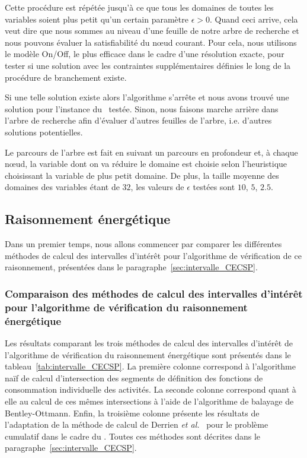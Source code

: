 Cette procédure est répétée jusqu'à ce que tous les domaines de toutes
les variables soient plus petit qu'un certain paramètre $\epsilon
>0$. Quand ceci arrive, cela veut dire que nous sommes au niveau d'une
feuille de notre arbre de recherche et nous pouvons évaluer la
satisfiabilité du n\oe ud courant. Pour cela, nous utilisons le modèle
On/Off, le plus efficace dans le cadre d'une résolution exacte, pour
tester si une solution avec les contraintes supplémentaires définies
le long de la procédure de branchement existe.

Si une telle solution existe alors l'algorithme s'arrête et nous avons
trouvé une solution pour l'instance du \CECSP~testée. Sinon, nous
faisons marche arrière dans l'arbre de recherche afin d'évaluer
d'autres feuilles de l'arbre, i.e. d'autres solutions potentielles. 

Le parcours de l'arbre est fait en suivant un parcours en profondeur
et, à chaque n\oe ud, la variable dont on va réduire le domaine est
choisie selon l'heuristique choisissant la variable de plus petit
domaine.  De plus, la taille moyenne des domaines des variables étant
de $32$, les valeurs de $\epsilon$ testées sont $10$, $5$, $2.5$.

\subsection{Raisonnement énergétique}
\label{sec:expe_RE}

Dans un premier temps, nous allons commencer par comparer les
différentes méthodes de calcul des intervalles d'intérêt pour
l'algorithme de vérification de ce raisonnement, présentées dans le
paragraphe~\ref{sec:intervalle_CECSP}. 

\subsubsection{Comparaison des méthodes de calcul des intervalles
  d'intérêt pour l'algorithme de vérification du raisonnement
  énergétique}

Les résultats comparant les trois méthodes de calcul des intervalles
d'intérêt de l'algorithme de vérification du raisonnement énergétique
sont présentés dans le tableau~\ref{tab:intervalle_CECSP}. La première
colonne correspond à l'algorithme naïf de calcul d'intersection des
segments de définition des fonctions de consommation individuelle des
activités. La seconde colonne correspond quant à elle au calcul de ces
mêmes intersections à l'aide de l'algorithme de balayage de
Bentley-Ottmann. Enfin, la troisième colonne présente les résultats de
l'adaptation de la méthode de calcul de Derrien {\it et al.}~\cite{DP}
pour le problème cumulatif dans le cadre du \CECSP. Toutes ces
méthodes sont décrites dans le
paragraphe~\ref{sec:intervalle_CECSP}.

